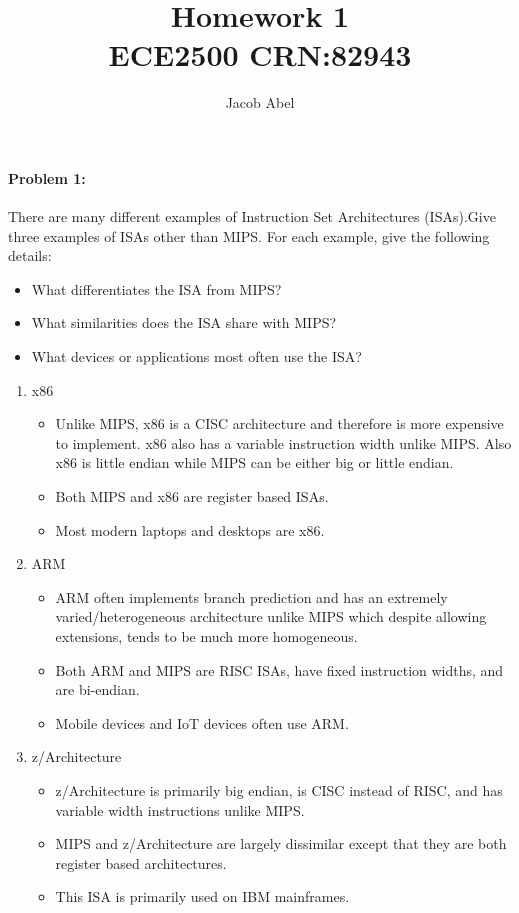 \documentclass[12pt,letterpaper,titlepage]{article}
\author{Jacob Abel}
\title{	Homework 1
	\\\large ECE2500 CRN:82943
}
\begin{document}
\maketitle
\begin{raggedright}

\paragraph{Problem 1: } There are many different examples of Instruction Set Architectures (ISAs).Give three examples of ISAs other than MIPS. For each example, give the following details:

\begin{itemize}
\item What differentiates the ISA from MIPS?
\item What similarities does the ISA share with MIPS?
\item What devices or applications most often use the ISA?
\end{itemize}

\begin{enumerate}
\item x86
\begin{itemize}
\item Unlike MIPS, x86 is a CISC architecture and therefore is more expensive to implement. x86 also has a variable instruction width unlike MIPS. Also x86 is little endian while MIPS can be either big or little endian.
\item Both MIPS and x86 are register based ISAs.
\item Most modern laptops and desktops are x86.
\end{itemize}

\item ARM
\begin{itemize}
\item ARM often implements branch prediction and has an extremely varied/heterogeneous architecture unlike MIPS which despite allowing extensions, tends to be much more homogeneous. 
\item Both ARM and MIPS are RISC ISAs, have fixed instruction widths, and are bi-endian.
\item Mobile devices and IoT devices often use ARM.
\end{itemize}

\item z/Architecture
\begin{itemize}
\item z/Architecture is primarily big endian, is CISC instead of RISC, and has variable width instructions unlike MIPS.
\item MIPS and z/Architecture are largely dissimilar except that they are both register based architectures.
\item This ISA is primarily used on IBM mainframes.
\end{itemize}


\end{enumerate}
\end{raggedright}
\end{document}
